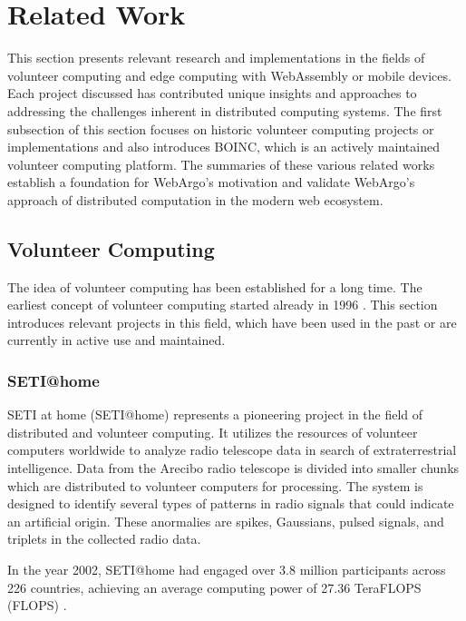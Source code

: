 \section{Related Work}
\label{sec:background:related_work}
This section presents relevant research and implementations in the fields of volunteer computing and edge computing with WebAssembly or mobile devices. Each project discussed has contributed unique insights and approaches to addressing the challenges inherent in distributed computing systems. The first subsection of this section focuses on historic volunteer computing projects or implementations and also introduces \acs{BOINC}, which is an actively maintained volunteer computing platform. The summaries of these various related works establish a foundation for WebArgo's motivation and validate WebArgo's approach of distributed computation in the modern web ecosystem.

\subsection{Volunteer Computing}
The idea of volunteer computing has been established for a long time. The earliest concept of volunteer computing started already in 1996 \cite{relatedwork:boinc1}. This section introduces relevant projects in this field, which have been used in the past or are currently in active use and maintained.

\subsubsection{SETI@home}
\label{subsec:background:related_work:seti}
\ac{SETI} at home (\ac{SETI}@home) represents a pioneering project in the field of distributed and volunteer computing. It utilizes the resources of volunteer computers worldwide to analyze radio telescope data in search of extraterrestrial intelligence. Data from the Arecibo radio telescope is divided into smaller chunks which are distributed to volunteer computers for processing. The system is designed to identify several types of patterns in radio signals that could indicate an artificial origin. These anormalies are spikes, Gaussians, pulsed signals, and triplets in the collected radio data. \cite{relatedwork:seti}

In the year 2002, \ac{SETI}@home had engaged over 3.8 million participants across 226 countries, achieving an average computing power of 27.36 Tera\acs{FLOPS} (\ac{FLOPS}) \cite{relatedwork:seti}.

